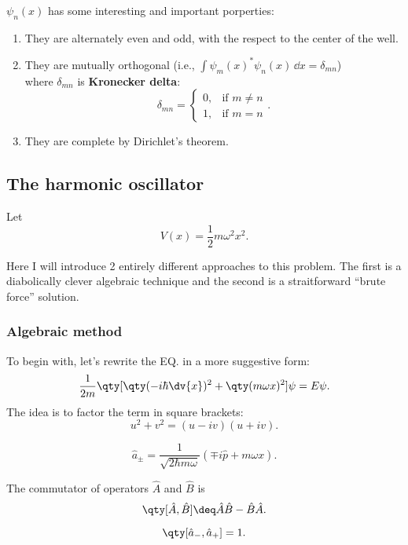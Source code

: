 \begin{prt}
	$\psi_n(x)$ has some interesting and important porperties:
	\begin{enumerate}
		\item They are alternately even and odd, with the respect to the center of the well.
		\item They are mutually orthogonal (i.e., $\displaystyle \int \psi_m(x)^*\psi_n(x) \,\dd x = \delta_{mn}$)\\
		      where $\delta_{mn}$ is \textbf{Kronecker delta}:
		      \[
			      \delta_{mn}=
			      \begin{cases}
				      0, & \mbox{if }m\ne n \\
				      1, & \mbox{if }m=n
			      \end{cases}
			      .\]
		\item They are complete by Dirichlet's theorem.
	\end{enumerate}
\end{prt}

\subsection{The harmonic oscillator}
Let
\[
	V(x)=\frac{1}{2}m\omega^2x^2
	.\]

Here I will introduce 2 entirely different approaches to this problem.
The first is a diabolically clever algebraic technique and the second is a straitforward ``brute force'' solution.

\subsubsection{Algebraic method}
To begin with, let's rewrite the EQ. in a more suggestive form:
\[
	\frac{1}{2m}\qty[\qty(-i\hbar\dv{x})^2+\qty(m\omega x)^2]\psi=E\psi
	.\]
The idea is to factor the term in square brackets:
\[
	u^2+v^2=(u-iv)(u+iv)
	.\]

\begin{defi}
	\[
		\hat{a}_\pm=\frac{1}{\sqrt{2\hbar m\omega}}(\mp i\hat{p}+m\omega x)
		.\]
\end{defi}

\begin{defi}[Commutator]
	The commutator of operators $\hat{A}$ and $\hat{B}$ is
	\[
		\qty[\hat{A},\hat{B}]\deq\hat{A}\hat{B}-\hat{B}\hat{A}
		.\]
\end{defi}

\begin{prt}
	\[
		\qty[\hat{a}_-,\hat{a}_+]=1
		.\]
\end{prt}

